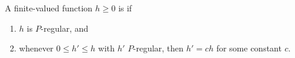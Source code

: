 A finite-valued function $h \geq 0$ is  if
\begin{enumerate}
\item $h$ is $P$-regular, and
\item whenever $0 \leq h' \leq h$ with $h'$ $P$-regular, then $h' = c h$ for some constant $c$.
\end{enumerate}
